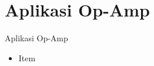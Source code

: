 \section{Aplikasi Op-Amp}
\begin{frame}{Aplikasi Op-Amp}
	\begin{itemize}
		\item Item
	\end{itemize}
\end{frame}